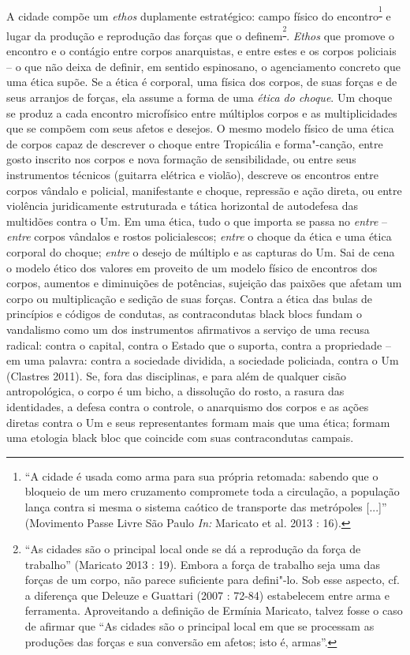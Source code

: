 A cidade compõe um \emph{ethos }duplamente estratégico: campo
físico do encontro\textsuperscript{\footnote{``A cidade é usada como
  arma para sua própria retomada: sabendo que o bloqueio de um mero
  cruzamento compromete toda a circulação, a população lança contra si
  mesma o sistema caótico de transporte das metrópoles {[}...{]}''
  (Movimento Passe Livre São Paulo \emph{In: }Maricato et al. 2013 :
  16).}} e lugar da produção e reprodução das forças que o
definem\textsuperscript{\footnote{``As cidades são o principal local
  onde se dá a reprodução da força de trabalho'' (Maricato 2013 : 19).
  Embora a força de trabalho seja uma das forças de um corpo, não parece
  suficiente para defini"-lo. Sob esse aspecto, cf. a diferença que
  Deleuze e Guattari (2007 : 72-84) estabelecem entre arma e ferramenta.
  Aproveitando a definição de Ermínia Maricato, talvez fosse o caso de
  afirmar que ``As cidades são o principal local em que se processam as
  produções das forças e sua conversão em afetos; isto é, armas''.}}.
\emph{Ethos} que promove o encontro e o contágio entre corpos
anarquistas, e entre estes e os corpos policiais -- o que não deixa de
definir, em sentido espinosano, o agenciamento concreto que uma ética
supõe. Se a ética é corporal, uma física dos corpos, de suas forças e de
seus arranjos de forças, ela assume a forma de uma \emph{ética do
choque}. Um choque se produz a cada encontro microfísico entre múltiplos
corpos e as multiplicidades que se compõem com seus afetos e desejos. O
mesmo modelo físico de uma ética de corpos capaz de descrever o choque
entre Tropicália e forma"-canção, entre gosto inscrito nos corpos e nova
formação de sensibilidade, ou entre seus instrumentos técnicos (guitarra
elétrica e violão), descreve os encontros entre corpos vândalo e
policial, manifestante e choque, repressão e ação direta, ou entre
violência juridicamente estruturada e tática horizontal de autodefesa
das multidões contra o Um. Em uma ética, tudo o que importa se passa no
\emph{entre} -- \emph{entre }corpos vândalos e rostos policialescos;
\emph{entre }o choque da ética e uma ética corporal do choque;
\emph{entre} o desejo de múltiplo e as capturas do Um. Sai de cena o
modelo ético dos valores em proveito de um modelo físico de encontros
dos corpos, aumentos e diminuições de potências, sujeição das paixões
que afetam um corpo ou multiplicação e sedição de suas forças. Contra a
ética das bulas de princípios e códigos de condutas, as contracondutas
black blocs fundam o vandalismo como um dos instrumentos afirmativos a
serviço de uma recusa radical: contra o capital, contra o Estado que o
suporta, contra a propriedade -- em uma palavra: contra a sociedade
dividida, a sociedade policiada, contra o Um (Clastres 2011). Se, fora
das disciplinas, e para além de qualquer cisão antropológica, o corpo é
um bicho, a dissolução do rosto, a rasura das identidades, a defesa
contra o controle, o anarquismo dos corpos e as ações diretas contra o
Um e seus representantes formam mais que uma ética; formam uma etologia
black bloc que coincide com suas contracondutas campais.

